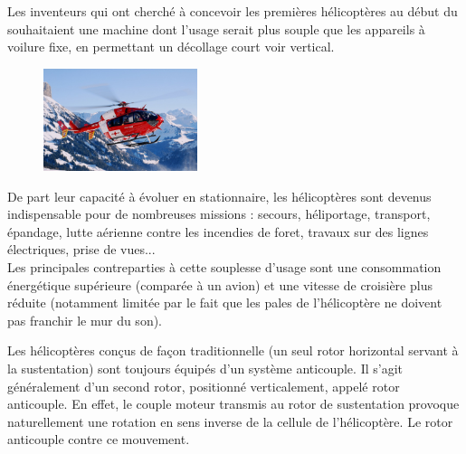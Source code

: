 		Les inventeurs qui ont cherché à concevoir les premières hélicoptères au début du  souhaitaient une machine dont l'usage serait plus souple que les appareils à voilure fixe, en permettant un décollage court voir vertical. \\
		
		
	\begin{figure}[H]
  	\centering
    \includegraphics[width=0.4\textwidth]{01-EtudeAeronefs/img/helicoptereEC145.jpg}
	\end{figure}	
		
		De part leur capacité à évoluer en stationnaire, les hélicoptères sont devenus indispensable pour de nombreuses missions : secours, héliportage, transport, épandage, lutte aérienne contre les incendies de foret, travaux sur des lignes électriques, prise de vues...\\
		
		Les principales contreparties à cette souplesse d'usage sont une consommation énergétique supérieure (comparée à un avion) et une vitesse de croisière plus réduite (notamment limitée par le fait que les pales de l'hélicoptère ne doivent pas franchir le mur du son).
		
		
		Les hélicoptères conçus de façon traditionnelle (un seul rotor horizontal servant à la sustentation) sont toujours équipés d'un système anticouple. Il s'agit généralement d'un second rotor, positionné verticalement, appelé rotor anticouple. En effet, le couple moteur transmis au rotor de sustentation provoque naturellement une rotation en sens inverse de la cellule de l'hélicoptère. Le rotor anticouple contre ce mouvement.
		
